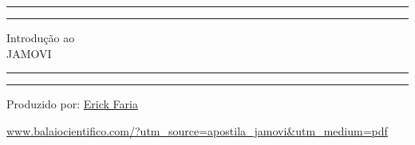 \begin{titlepage}
	\centering %
	\scshape %
	\vspace*{1.5\baselineskip} %

	\rule{13cm}{1.6pt}\vspace*{-\baselineskip}\vspace*{2pt} %
	\rule{13cm}{0.4pt} %
	
		\vspace{0.75\baselineskip} %
	{	\Huge Introdução ao\\ 
			\vspace{4mm}
		JAMOVI \\	}
		\vspace{0.75\baselineskip} %
	\rule{13cm}{0.4pt}\vspace*{-\baselineskip}\vspace{3.2pt} %
	\rule{13cm}{1.6pt} %
	
		\vspace{1.75\baselineskip} %
	{\large Produzido por: \href{https://www.balaiocientifico.com/author/erickfaria/?utm_source=apostila_jamovi&utm_medium=pdf}{Erick Faria} \\
		\vspace*{1.2\baselineskip}}
	\vfill
	
\url{www.balaiocientifico.com/?utm_source=apostila_jamovi&utm_medium=pdf}\\
\vspace{0.5cm}
\ccby
\end{titlepage}